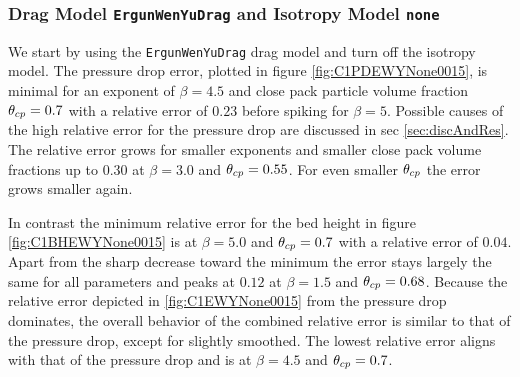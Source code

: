 



\subsubsection{Drag Model \lstinline|ErgunWenYuDrag| and Isotropy Model \lstinline|none|}
We start by using the \lstinline|ErgunWenYuDrag| drag model and turn off the isotropy model.
The pressure drop error, plotted in figure \ref{fig:C1PDEWYNone0015}, is minimal for an exponent of $\beta = 4.5$ and close pack particle volume fraction $\theta_{cp} = 0.7$ with a relative error of $0.23$ before spiking for $\beta = 5$. Possible causes of the high relative error for the pressure drop are discussed in sec \ref{sec:discAndRes}.
The relative error grows for smaller exponents and smaller close pack volume fractions up to $0.30$ at $\beta = 3.0$ and $\theta_{cp} = 0.55$.
For even smaller $\theta_{cp}$ the error grows smaller again.



In contrast the minimum relative error for the bed height in figure \ref{fig:C1BHEWYNone0015} is at $\beta = 5.0$ and $\theta_{cp} = 0.7$ with a relative error of $0.04$. Apart from the sharp decrease toward the minimum the error stays largely the same for all parameters and peaks at $0.12$ at $\beta = 1.5$ and $\theta_{cp} = 0.68$.
Because the relative error depicted in \ref{fig:C1EWYNone0015} from the pressure drop dominates, the overall behavior of the combined relative error is similar to that of the pressure drop, except for slightly smoothed. The lowest relative error aligns with that of the pressure drop and is at $\beta = 4.5$ and $\theta_{cp} = 0.7$. 

